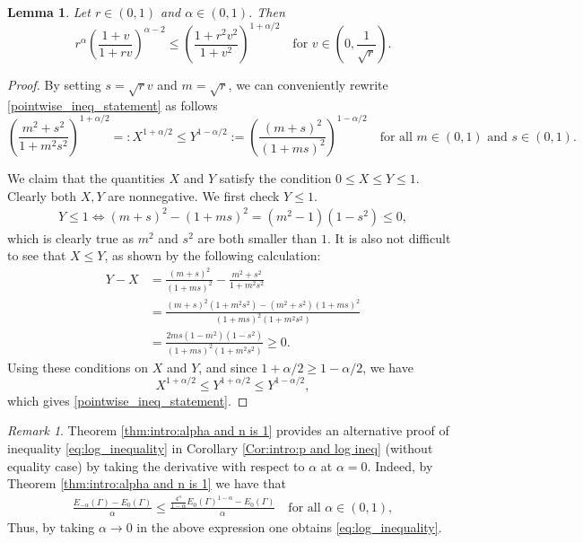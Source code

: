 \documentclass[10pt,leqno]{amsart}
\numberwithin{Theorem}{section}
\newtheorem{Lemma}[Theorem]{Lemma}
\theoremstyle{definition}
\theoremstyle{remark}
\newtheorem{Remark}[Theorem]{Remark}
\numberwithin{equation}{section}
\numberwithin{equation}{section}
\begin{document}
\begin{Lemma}\label{lm:pointwise_ineq_}
    Let $r \in (0,1)$ and $\alpha \in (0,1)$. Then
    \begin{equation} \label{pointwise_ineq_statement}
    r^{\alpha} \left( \frac{1+v}{1+rv} \right)^{\alpha-2} \leq \left( \frac{1+r^2v^2}{1+v^2} \right)^{1+\alpha/2} \quad \text{for } v \in \left(0, \frac{1}{\sqrt{r}}\right).
    \end{equation}
    \end{Lemma}
\begin{proof}
    By setting $s=\sqrt{r} v$ and $m=\sqrt{r}$, we can conveniently rewrite \eqref{pointwise_ineq_statement} as follows
    \[
   \left(\frac{m^2+s^2}{1+m^2s^2}\right)^{1+\alpha/2}=:X^{1+\alpha/2} \leq Y^{1-\alpha/2}:=\left( \frac{(m+s)^2}{(1+ms)^2}\right)^{1-\alpha/2}
   \quad \text{for all } m\in(0,1)\text{ and }s\in (0,1).
    \]
    

We claim that the quantities $X$ and $Y$ satisfy the condition $0 \leq X \leq Y \leq 1$.
    Clearly both $X,Y$ are nonnegative. We first check $Y\leq 1$.
    \begin{align*}
        Y\leq 1 \iff (m+s)^{2} - (1+ms)^2=(m^2-1)(1-s^2) \leq 0,
    \end{align*}
    which is clearly true as $m^2$ and $s^2$ are both smaller than $1.$
    It is also not difficult to see that $X \leq Y$, as shown by the following calculation:
    \begin{align*}
        Y-X &= \frac{(m+s)^2}{(1+ms)^2}- \frac{m^2+s^2}{1+m^2s^2} \\
        &=\frac{(m+s)^2(1+m^2s^2)- (m^2+s^2)(1+ms)^2}{(1+ms)^2(1+m^2s^2)} \\
        &=\frac{2ms(1-m^2)(1-s^2)}{(1+ms)^2(1+m^2s^2)} \geq 0.
    \end{align*}
 Using these conditions on $X$ and $Y$, and since $1+\alpha/2 \geq 1-\alpha/2$, we have
\[
X^{1+\alpha/2} \leq Y^{1+\alpha/2} \leq Y^{1-\alpha/2},
\]
which gives \eqref{pointwise_ineq_statement}.
\end{proof}
















\begin{Remark}\label{remark:Almut}
Theorem \ref{thm:intro:alpha and n is 1} provides an alternative proof of  inequality \eqref{eq:log_inequality} in Corollary \ref{Cor:intro:p and log ineq} (without equality case) by taking the derivative with respect to $\alpha$ at $\alpha=0.$  Indeed, by Theorem \ref{thm:intro:alpha and n is 1} we have that
\begin{align*}
   \frac{ E_{-\alpha}(\Gamma) - E_0(\Gamma)}{\alpha}  \leq \frac{\frac{4^{\alpha}}{1-\alpha}E_0(\Gamma)^{1-\alpha}-E_0(\Gamma)}{\alpha} \quad \text{for all $\alpha \in (0,1)$},
\end{align*}
Thus, by taking $\alpha \to 0$ in the above expression one obtains \eqref{eq:log_inequality}.
\end{Remark}
\end{document}
